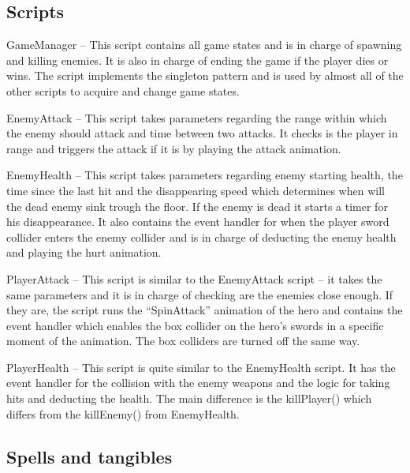\documentclass[sigchi, authorversion, screen]{acmart}
\begin{document}
\subsection{Scripts}

GameManager – This script contains all game states and is in charge of spawning and killing enemies. It is also in charge of ending the game if the player dies or wins. The script implements the singleton pattern and is used by almost all of the other scripts to acquire and change game states.

EnemyAttack – This script takes parameters regarding the range within which the enemy should attack and time between two attacks. It checks is the player in range and triggers the attack if it is by playing the attack animation.

EnemyHealth – This script takes parameters regarding enemy starting health, the time since the last hit and the disappearing speed which determines when will the dead enemy sink trough the floor. If the enemy is dead it starts a timer for his disappearance.  It also contains the event handler for when the player sword collider enters the enemy collider and is in charge of deducting the enemy health and playing the hurt animation.

PlayerAttack – This script is similar to the EnemyAttack script – it takes the same parameters and it is in charge of checking are the enemies close enough. If they are, the script runs the “SpinAttack” animation of the hero and contains the event handler which enables the box collider on the hero’s swords in a specific moment of the animation. The box colliders are turned off the same way.

PlayerHealth – This script is quite similar to the EnemyHealth script. It has the event handler for the collision with the enemy weapons and the logic for taking hits and deducting the health. The main difference is the killPlayer() which differs from the killEnemy() from EnemyHealth.


\subsection{Spells and tangibles}
\end{document}
